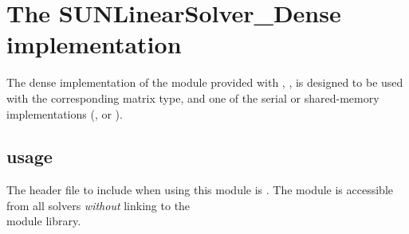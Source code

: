 \section{The SUNLinearSolver\_Dense implementation}\label{ss:sunlinsol_dense}

The dense implementation of the {\sunlinsol} module provided with
{\sundials}, {\sunlinsoldense}, is designed to be used with the
corresponding {\sunmatdense} matrix type, and one of the serial or
shared-memory {\nvector} implementations ({\nvecs}, {\nvecopenmp} or
{\nvecpthreads}).

\subsection{{\sunlinsoldense} usage}\label{ss:sunlinsol_dense_usage}

The header file to include when using this module 
is . The {\sunlinsoldense} module
is accessible from all {\sundials} solvers \textit{without}
linking to the \\ \noindent
{} module library.


